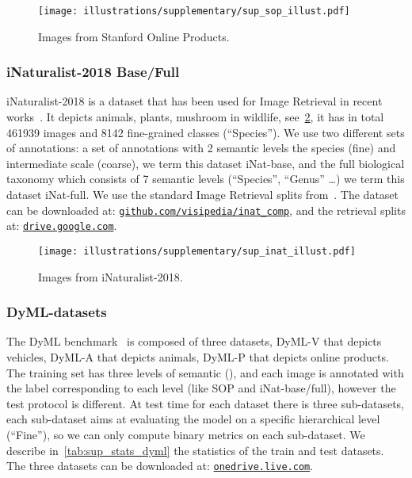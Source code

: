 \begin{figure}[ht]
    \centering
    \texttt{[image: illustrations/supplementary/sup\_sop\_illust.pdf]}
    \caption{Images from Stanford Online Products.}
    \label{fig:sup_sop_illust}
\end{figure}

\subsubsection{iNaturalist-2018 Base/Full} iNaturalist-2018 is a dataset that has been used for Image Retrieval in recent works~\cite{smoothap,ramzi2021robust}. It depicts animals, plants, mushroom \etc in wildlife, see~\cref{fig:sup_inat_illust}, it has in total \num{461 939} images and \num{8142} fine-grained classes (``Species''). We use two different sets of annotations: a set of annotations with 2 semantic levels the species (fine) and intermediate scale (coarse), we term this dataset iNat-base, and the full biological taxonomy which consists of 7 semantic levels (``Species'', ``Genus'' \dots) we term this dataset iNat-full. We use the standard Image Retrieval splits from~\cite{smoothap}. The dataset can be downloaded at: \href{https://github.com/visipedia/inat_comp/tree/master/2018}{\nolinkurl{github.com/visipedia/inat_comp}}, and the retrieval splits at: \href{https://drive.google.com/file/d/1sXfkBTFDrRU3__-NUs1qBP3sf_0uMB98/view?usp=sharing}{\nolinkurl{drive.google.com}}. 


\begin{figure}[ht]
    \centering
    \texttt{[image: illustrations/supplementary/sup\_inat\_illust.pdf]}
    \caption{Images from iNaturalist-2018.}
    \label{fig:sup_inat_illust}
\end{figure}


\subsubsection{DyML-datasets} The DyML benchmark~\cite{sun2021dynamic} is composed of three datasets, DyML-V that depicts vehicles, DyML-A that depicts animals, DyML-P that depicts online products. The training set has three levels of semantic (), and each image is annotated with the label corresponding to each level (like SOP and iNat-base/full), however the test protocol is different. At test time for each dataset there is three sub-datasets, each sub-dataset aims at evaluating the model on a specific hierarchical level (\eg ``Fine''), so we can only compute binary metrics on each sub-dataset. We describe in~\cref{tab:sup_stats_dyml} the statistics of the train and test datasets. The three datasets can be downloaded at: \href{https://onedrive.live.com/?authkey=\%21AMLHa5h\%2D56ZZL94\&id=F4EF5F480284E1C2\%21106\&cid=F4EF5F480284E1C2}{\nolinkurl{onedrive.live.com}}.


